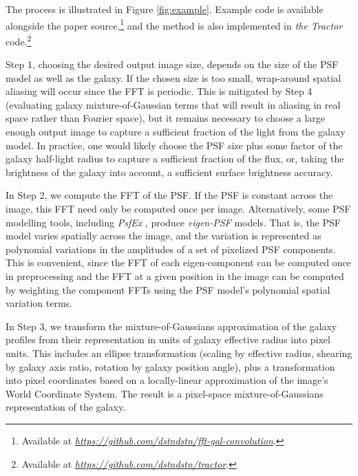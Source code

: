 \documentclass[11pt,preprint]{aastex}
\newcommand{\niceurl}[1]{\href{#1}{\textsl{#1}}}
\newcommand{\project}[1]{\textsl{#1}}
\begin{document}
The process is illustrated in Figure \ref{fig:example}.  Example code
is available alongside the paper source,\footnote{ Available at
  \niceurl{https://github.com/dstndstn/fft-gal-convolution}.}  and the
method is also implemented in \project{the Tractor} code.\footnote{%
  Available at
  \niceurl{https://github.com/dstndstn/tractor}.}

Step 1, choosing the desired output image size, depends on the size of
the PSF model as well as the galaxy.  If the chosen size is too small,
wrap-around spatial aliasing will occur since the FFT is periodic.
This is mitigated by Step 4 (evaluating galaxy mixture-of-Gaussian
terms that will result in aliasing in real space rather than Fourier
space), but it remains necessary to choose a large enough output image
to capture a sufficient fraction of the light from the galaxy model.
In practice, one would likely choose the PSF size plus some factor of
the galaxy half-light radius to capture a sufficient fraction of the
flux, or, taking the brightness of the galaxy into account, a
sufficient surface brightness accuracy.

In Step 2, we compute the FFT of the PSF.  If the PSF is constant
across the image, this FFT need only be computed once per image.
Alternatively, some PSF modelling tools, including \project{PsfEx}
\citep{psfex}, produce \emph{eigen-PSF} models.  That is, the PSF
model varies spatially across the image, and the variation is
represented as polynomial variations in the amplitudes of a set of
pixelized PSF components.  This is convenient, since the FFT of each
eigen-component can be computed once in preprocessing and the FFT at a
given position in the image can be computed by weighting the component
FFTs using the PSF model's polynomial spatial variation terms.

In Step 3, we transform the mixture-of-Gaussians approximation of the
galaxy profiles from their representation in units of galaxy effective
radius into pixel units.  This includes an ellipse transformation
(scaling by effective radius, shearing by galaxy axis ratio, rotation
by galaxy position angle), plus a transformation into pixel
coordinates based on a locally-linear approximation of the image's
World Coordinate System.
The result is a pixel-space mixture-of-Gaussians representation of the
galaxy.
\end{document}
